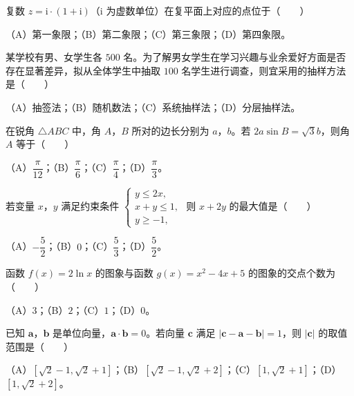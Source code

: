 \begin{question}
复数 $z=\mathrm i\cdot(1+\mathrm i)$（$\mathrm i$ 为虚数单位）在复平面上对应的点位于\mbox{（　　）}

（A）第一象限；（B）第二象限；（C）第三象限；（D）第四象限。

\end{question}
\begin{question}
某学校有男、女学生各 $500$ 名。为了解男女学生在学习兴趣与业余爱好方面是否存在显著差异，拟从全体学生中抽取 $100$ 名学生进行调查，则宜采用的抽样方法是\mbox{（　　）}

（A）抽签法；（B）随机数法；（C）系统抽样法；（D）分层抽样法。

\end{question}
\begin{question}
在锐角 $\triangle ABC$ 中，角 $A$，$B$ 所对的边长分别为 $a$，$b$。若 $2a\sin B=\sqrt3b$，则角 $A$ 等于\mbox{（　　）}

（A）$\dfrac{\pi}{12}$；（B）$\dfrac{\pi}{6}$；（C）$\dfrac{\pi}{4}$；（D）$\dfrac{\pi}{3}$。

\end{question}
\begin{question}
若变量 $x$，$y$ 满足约束条件 $\begin{cases}y\leqslant 2x,\\x+y\leqslant 1,\\y\geqslant -1,\end{cases}$ 则 $x+2y$ 的最大值是\mbox{（　　）}

（A）$-\dfrac52$；（B）$0$；（C）$\dfrac53$；（D）$\dfrac52$。

\end{question}
\begin{question}
函数 $f(x)=2\ln x$ 的图象与函数 $g(x)=x^2-4x+5$ 的图象的交点个数为\mbox{（　　）}

（A）$3$；（B）$2$；（C）$1$；（D）$0$。

\end{question}
\begin{question}
已知 $\boldsymbol a$，$\boldsymbol b$ 是单位向量，$\boldsymbol a\cdot\boldsymbol b=0$。若向量 $\boldsymbol c$ 满足 $|\boldsymbol c-\boldsymbol a-\boldsymbol b|=1$，则 $|\boldsymbol c|$ 的取值范围是\mbox{（　　）}

（A）$[\sqrt2-1,\sqrt2+1]$；（B）$[\sqrt2-1,\sqrt2+2]$；（C）$[1,\sqrt2+1]$；（D）$[1,\sqrt2+2]$。

\end{question}
